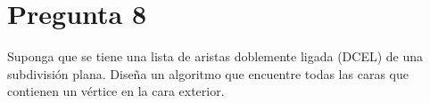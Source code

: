 \large\section*{Pregunta 8}\Large

Suponga que se tiene una lista de aristas doblemente ligada (DCEL) de una subdivisión plana. Diseña un algoritmo que encuentre todas las caras que contienen un vértice en la cara exterior.
